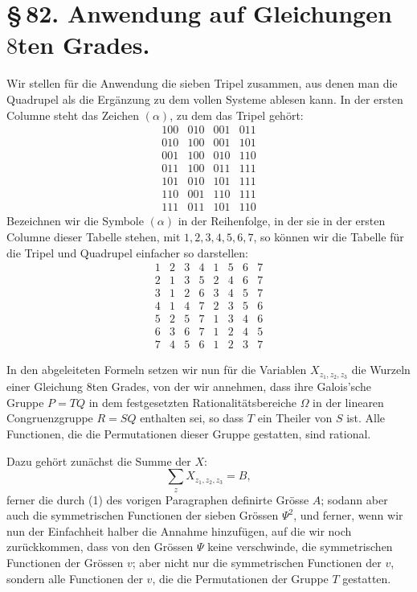 \documentclass[11pt]{article}
\begin{document}
\section*{\S\,82. Anwendung auf Gleichungen $8$ten Grades.}

Wir stellen für die Anwendung die sieben Tripel zusammen, aus denen man die Quadrupel als die Ergänzung zu dem vollen Systeme ablesen kann. In der ersten Columne steht das Zeichen $(\alpha)$, zu dem das Tripel gehört:
\[
\begin{array}{c|ccc}
100&010&001&011\\
010&100&001&101\\
001&100&010&110\\
011&100&011&111\\
101&010&101&111\\
110&001&110&111\\
111&011&101&110
\end{array}
\]
Bezeichnen wir die Symbole $(\alpha)$ in der Reihenfolge, in der sie in der ersten Columne dieser Tabelle stehen, mit $1,2,3,4,5,6,7$, so können wir die Tabelle für die Tripel und Quadrupel einfacher so darstellen:
\[
\begin{array}{c|ccc|cccc}
1&2&3&4&1&5&6&7\\
2&1&3&5&2&4&6&7\\
3&1&2&6&3&4&5&7\\
4&1&4&7&2&3&5&6\\
5&2&5&7&1&3&4&6\\
6&3&6&7&1&2&4&5\\
7&4&5&6&1&2&3&7
\end{array}
\]

In den abgeleiteten Formeln setzen wir nun für die Variablen $X_{z_1,z_2,z_3}$ die Wurzeln einer Gleichung $8$ten Grades, von der wir annehmen, dass ihre Galois'sche Gruppe $P=TQ$ in dem festgesetzten Rationalitätsbereiche $\Omega$ in der linearen Congruenzgruppe $R=SQ$ enthalten sei, so dass $T$ ein Theiler von $S$ ist. Alle Functionen, die die Permutationen dieser Gruppe gestatten, sind rational.

Dazu gehört zunächst die Summe der $X$:
\begin{equation}
 \sum_z X_{z_1,z_2,z_3}=B,
 \tag{1}
\end{equation}
ferner die durch (1) des vorigen Paragraphen definirte Grösse $A$; sodann aber auch die symmetrischen Functionen der sieben Grössen $\Psi^2$, und ferner, wenn wir nun der Einfachheit halber die Annahme hinzufügen, auf die wir noch zurückkommen, dass von den Grössen $\Psi$ keine verschwinde, die symmetrischen Functionen der Grössen $v$; aber nicht nur die symmetrischen Functionen der $v$, sondern alle Functionen der $v$, die die Permutationen der Gruppe $T$ gestatten.
\end{document}
